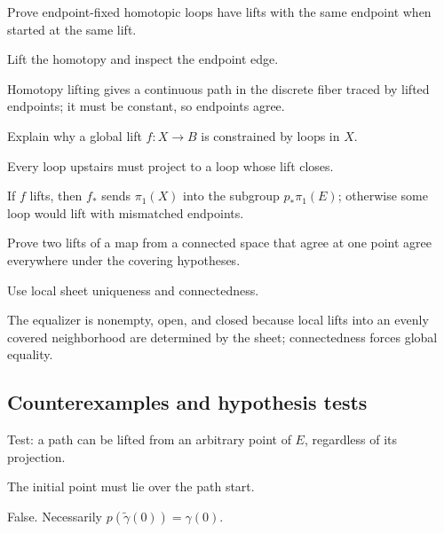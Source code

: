 \begin{exercise}\label{exr:viii11-ped-07}
Prove endpoint-fixed homotopic loops have lifts with the same endpoint when started at the same lift.
\end{exercise}
\begin{hint}
Lift the homotopy and inspect the endpoint edge.
\end{hint}
\begin{solution}
Homotopy lifting gives a continuous path in the discrete fiber traced by lifted endpoints; it must be constant, so endpoints agree.
\end{solution}

\begin{exercise}\label{exr:viii11-ped-08}
Explain why a global lift $f:X\to B$ is constrained by loops in $X$.
\end{exercise}
\begin{hint}
Every loop upstairs must project to a loop whose lift closes.
\end{hint}
\begin{solution}
If $f$ lifts, then $f_*$ sends $\pi_1(X)$ into the subgroup $p_*\pi_1(E)$; otherwise some loop would lift with mismatched endpoints.
\end{solution}

\begin{exercise}\label{exr:viii11-ped-09}
Prove two lifts of a map from a connected space that agree at one point agree everywhere under the covering hypotheses.
\end{exercise}
\begin{hint}
Use local sheet uniqueness and connectedness.
\end{hint}
\begin{solution}
The equalizer is nonempty, open, and closed because local lifts into an evenly covered neighborhood are determined by the sheet; connectedness forces global equality.
\end{solution}

\subsection*{Counterexamples and hypothesis tests}

\begin{exercise}\label{exr:viii11-ped-10}
Test: a path can be lifted from an arbitrary point of $E$, regardless of its projection.
\end{exercise}
\begin{hint}
The initial point must lie over the path start.
\end{hint}
\begin{solution}
False. Necessarily $p(\widetilde\gamma(0))=\gamma(0)$.
\end{solution}

